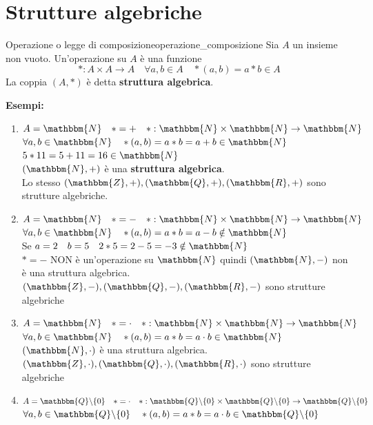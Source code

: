 \documentclass[12pt, letterpaper]{report}
\newcounter{definition}
\newcommand{\nmu}{}
\begin{document}
		\chapter{Strutture algebriche}
		\begin{definition}{\nmu Operazione o legge di composizione}{operazione_composizione}
			Sia $A$ un insieme non vuoto. Un'operazione su $A$ è una funzione \[*: A \times A \to A \quad \forall a,b \in A \quad *(a,b) = a*b \in A\]
			La coppia $(A, *)$ è detta \textbf{struttura algebrica}.
		\end{definition}
		\textbf{Esempi:}
		\begin{enumerate}
			\item $A = \mathbbm{N} \quad *=+ \quad *:\mathbbm{N} \times \mathbbm{N} \to \mathbbm{N}$ \\
			$\forall a,b \in \mathbbm{N} \quad *(a, b) = a*b = a+b \in \mathbbm{N}$ \\
			$5*11=5+11=16 \in \mathbbm{N}$\\
			$(\mathbbm{N}, +)$ è una \textbf{struttura algebrica}. \\
			Lo stesso $(\mathbbm{Z}, +), (\mathbbm{Q}, +), (\mathbbm{R}, +)$ sono strutture algebriche.
			\item $A = \mathbbm{N} \quad *=- \quad *:\mathbbm{N} \times \mathbbm{N} \to \mathbbm{N}$ \\
			$\forall a,b \in \mathbbm{N} \quad *(a, b) = a*b = a-b \notin \mathbbm{N}$ \\
			Se $a=2 \quad b=5 \quad 2*5 = 2-5=-3 \notin \mathbbm{N}$ \\
			$*=-$ NON è un'operazione su $\mathbbm{N}$ quindi $(\mathbbm{N}, -)$ non è una struttura algebrica. \\
			$(\mathbbm{Z}, -), (\mathbbm{Q}, -), (\mathbbm{R}, -)$ sono strutture algebriche
			\item $A = \mathbbm{N} \quad *=\cdot \quad *:\mathbbm{N} \times \mathbbm{N} \to \mathbbm{N}$ \\
			$\forall a,b \in \mathbbm{N} \quad *(a, b) = a*b = a\cdot b \in \mathbbm{N}$ \\
			$(\mathbbm{N}, \cdot)$ è una struttura algebrica. \\
			$(\mathbbm{Z}, \cdot), (\mathbbm{Q}, \cdot), (\mathbbm{R}, \cdot)$ sono strutture algebriche
			\item $A = \mathbbm\{Q\}\backslash\{0\} \quad *=\cdot \quad *:\mathbbm\{Q\}\backslash\{0\} \times \mathbbm{Q}\backslash\{0\} \to \mathbbm{Q} \backslash \{0\}$ \\
			$\forall a,b \in \mathbbm{Q}\backslash\{0\} \quad *(a, b) = a*b = a\cdot b \in \mathbbm{Q} \backslash \{0\}$ \\

\end{enumerate}
\end{document}
